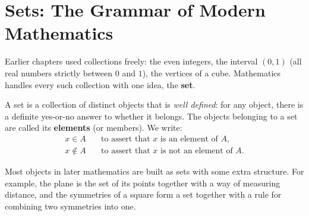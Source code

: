 \section{Sets: The Grammar of Modern Mathematics}
\chapterline

Earlier chapters used collections freely: the even integers, the interval $(0, 1)$ (all real numbers strictly between $0$ and $1$), the vertices of a cube. Mathematics handles every such collection with one idea, the \textbf{set}.

A set is a collection of distinct objects that is \emph{well defined}: for any object, there is a definite yes-or-no answer to whether it belongs. The objects belonging to a set are called its \textbf{elements} (or members). We write:
\begin{align*}
x \in A &\quad \text{to assert that } x \text{ is an element of } A, \\
x \notin A &\quad \text{to assert that } x \text{ is not an element of } A.
\end{align*}

Most objects in later mathematics are built as sets with some extra structure. For example, the plane is the set of its points together with a way of measuring distance, and the symmetries of a square form a set together with a rule for combining two symmetries into one.

